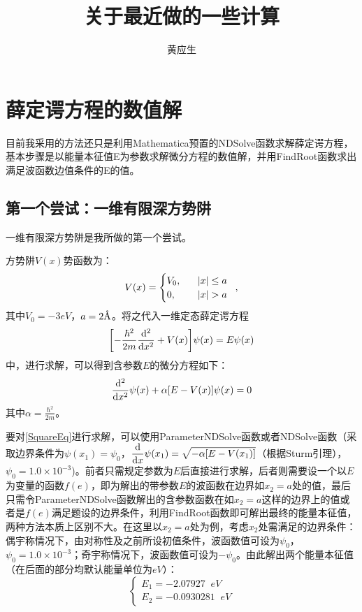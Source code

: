\documentclass{ctexart}
\title{关于最近做的一些计算}
\author{黄应生}
\date{}
\begin{document}
\maketitle
\tableofcontents

\section{薛定谔方程的数值解}
目前我采用的方法还只是利用Mathematica预置的NDSolve函数求解薛定谔方程，基本步骤是以能量本征值E为参数求解微分方程的数值解，并用FindRoot函数求出满足波函数边值条件的E的值。
\subsection{第一个尝试：一维有限深方势阱}
一维有限深方势阱是我所做的第一个尝试。

方势阱$V(x)$势函数为：
\begin{equation}
V(x)=
\begin{cases}
  V_0, & \;\;\;\abs{x}\leq a \\
  0, &  \;\;\;\abs{x}>a
\end{cases}
\text{\;\;,}\end{equation}
其中$V_0=-3eV$，$a=2\text{\r{A}}$。将之代入一维定态薛定谔方程
\begin{equation}\label{Schrodinger}
  \bqty{-\frac{\hbar^2}{2m}\dv[2]{x}+V(x)}\psi(x)=E\psi(x)
\end{equation}
中，进行求解，可以得到含参数$E$的微分方程如下：
\begin{equation}\label{SquareEq}
  \dv[2]{x}\psi(x)+\alpha\bqty{E-V(x)}\psi(x)=0
\end{equation}
其中$\displaystyle\alpha=\frac{\hbar^2}{2m}$。

要对\eqref{SquareEq}进行求解，可以使用ParameterNDSolve函数或者NDSolve函数（采取边界条件为$\psi(x_1)=\psi_0$，$\displaystyle\dv{x}\psi(x_1)=\sqrt{-\alpha\bqty{E-V(x_1)}}$（根据Sturm引理），$\psi_0=1.0\times10^{-3}$)。前者只需规定参数为$E$后直接进行求解，后者则需要设一个以$E$为变量的函数$f(e)$，即为解出的带参数$E$的波函数在边界如$x_2=a$处的值，最后只需令ParameterNDSolve函数解出的含参数函数在如$x_2=a$这样的边界上的值或者是$f(e)$满足题设的边界条件，利用FindRoot函数即可解出最终的能量本征值，两种方法本质上区别不大。在这里以$x_2=a$处为例，考虑$x_2$处需满足的边界条件：偶宇称情况下，由对称性及之前所设初值条件，波函数值可设为$\psi_0$，$\psi_0=1.0\times10^{-3}$；奇宇称情况下，波函数值可设为$-\psi_0$。由此解出两个能量本征值（在后面的部分均默认能量单位为$eV$）：
\[
\left\{
\begin{array}{l}
  E_1 = -2.07927\;\; eV\\
  E_2 = -0.0930281\;\;eV
\end{array}
\right.
\]
\end{document}
